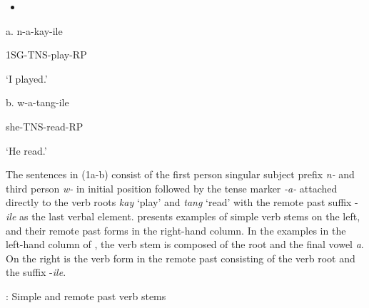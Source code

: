 \documentclass[output=paper]{langsci/langscibook}
\begin{document}
\begin{itemize}
\item \end{itemize}
\begin{stylelsSourceline}
a.  n-a-kay-ile
\end{stylelsSourceline}

\begin{stylelsIMT}
  1SG-TNS{}-play-RP
\end{stylelsIMT}

\begin{stylelsTranslationSubexample}
  ‘I played.’
\end{stylelsTranslationSubexample}

\begin{stylelsSourceline}
b.  w-a-tang-ile
\end{stylelsSourceline}

\begin{stylelsIMT}
  she{}-TNS{}-read-RP
\end{stylelsIMT}

\begin{stylelsTranslationSubexample}
  ‘He read.’
\end{stylelsTranslationSubexample}

The sentences in (1a-b) consist of the first person singular subject prefix \emph{n-} and third person \emph{w-} in initial position followed by the tense marker \emph{{}-a-} attached directly to the verb roots \emph{kay} ‘play’ and \textit{tang} ‘read’ with the remote past suffix -\emph{ile} as the last verbal element.  presents examples of simple verb stems on the left, and their remote past forms in the right-hand column. In the examples in the left-hand column of , the verb stem is composed of the root and the final vowel \textit{a}. On the right is the verb form in the remote past consisting of the verb root and the suffix -\textit{ile}.


 : Simple and remote past verb stems
\end{document}

